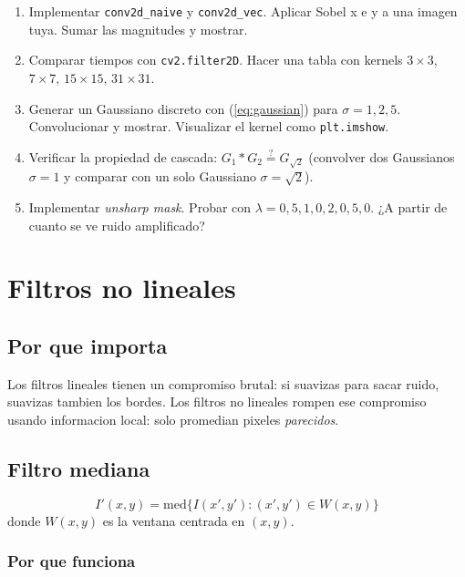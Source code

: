 \documentclass[11pt,a4paper,twoside,openright]{book}
\begin{document}
\begin{ejercicio}
\begin{enumerate}[leftmargin=2em]
  \item Implementar \texttt{conv2d\_naive} y \texttt{conv2d\_vec}. Aplicar Sobel x e y a una imagen tuya. Sumar las magnitudes y mostrar.
  \item Comparar tiempos con \texttt{cv2.filter2D}. Hacer una tabla con kernels $3{\times}3$, $7{\times}7$, $15{\times}15$, $31{\times}31$.
  \item Generar un Gaussiano discreto con (\ref{eq:gaussian}) para $\sigma = 1, 2, 5$. Convolucionar y mostrar. Visualizar el kernel como \texttt{plt.imshow}.
  \item Verificar la propiedad de cascada: $G_1 * G_2 \overset{?}{=} G_{\sqrt{2}}$ (convolver dos Gaussianos $\sigma=1$ y comparar con un solo Gaussiano $\sigma=\sqrt{2}$).
  \item Implementar \emph{unsharp mask}. Probar con $\lambda = 0{,}5, 1{,}0, 2{,}0, 5{,}0$. ¿A partir de cuanto se ve ruido amplificado?
\end{enumerate}
\end{ejercicio}

\chapter{Filtros no lineales}
\label{ch:nolineal}

\section{Por que importa}

Los filtros lineales tienen un compromiso brutal: si suavizas para sacar ruido, suavizas tambien los bordes. Los filtros no lineales rompen ese compromiso usando informacion local: solo promedian pixeles \emph{parecidos}.

\section{Filtro mediana}

\begin{equation}
I'(x,y) = \mathrm{med}\{I(x',y') : (x',y') \in W(x,y)\}
\end{equation}
donde $W(x,y)$ es la ventana centrada en $(x,y)$.

\subsection{Por que funciona}
\end{document}
